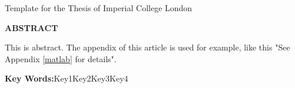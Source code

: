 \vspace*{-21.6pt}
\begin{center}
\Large\englishbf
\rmfamily Template for the Thesis of Imperial College London
\end{center}
\par
{}
{}
\begin{center}
    \fontsize{14pt}{17pt}\selectfont\rmfamily\bfseries
ABSTRACT
\end{center}

\par
This is abstract. The appendix of this article is used for example, like this "See Appendix \ref{matlab} for details".

\bigskip
\noindent\textbf{Key Words:}\quad Key1\quad Key2\quad Key3\quad Key4
